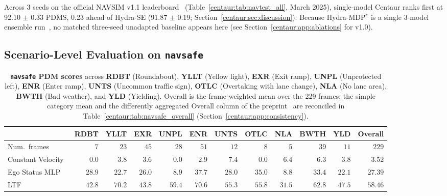 Across 3 seeds on the official NAVSIM v1.1 leaderboard~\cite{dauner2024navsim} (Table~\ref{centaur:tab:navtest_all}, March 2025), single-model Centaur ranks first at 92.10 $\pm$ 0.33 PDMS, 0.23 ahead of Hydra-SE (91.87 $\pm$ 0.19; Section~\ref{centaur:sec:discussion}). Because Hydra-MDP$^{\ast}$ is a single 3-model ensemble run~\cite{li2024hydramdp}, no matched three-seed unadapted baseline appears here (see Section~\ref{centaur:app:ablations} for v1.0).

\subsection{Scenario-Level Evaluation on \texorpdfstring{\texttt{navsafe}}{navsafe}}\label{centaur:sec:navsafe_results}
\suppressfloats[t]

\begin{table}[tbp]
  \centering
  \caption[\texttt{navsafe} PDM scores by scenario category]{\textbf{\texttt{navsafe} PDM scores} across \textbf{RDBT} (Roundabout), \textbf{YLLT} (Yellow light), \textbf{EXR} (Exit ramp), \textbf{UNPL} (Unprotected left), \textbf{ENR} (Enter ramp), \textbf{UNTS} (Uncommon traffic sign), \textbf{OTLC} (Overtaking with lane change), \textbf{NLA} (No lane area), \textbf{BWTH} (Bad weather), and \textbf{YLD} (Yielding). Overall is the frame-weighted mean over the 229 frames; the simple category mean and the differently aggregated Overall column of the preprint~\cite{sima2024centaur} are reconciled in Table~\ref{centaur:tab:navsafe_overall} (Section~\ref{centaur:app:consistency}).}
  \label{centaur:tab:navsafe}
  \begin{adjustbox}{max width=\textwidth}
  \begin{tabular}{l|rrrrrrrrrr|r}
    \toprule
    & \textbf{RDBT} & \textbf{YLLT} & \textbf{EXR} & \textbf{UNPL} & \textbf{ENR} & \textbf{UNTS} & \textbf{OTLC} & \textbf{NLA} & \textbf{BWTH} & \textbf{YLD} & \textbf{Overall} \\
    \midrule
    Num.\ frames & $7$ & $23$ & $45$ & $28$ & $51$ & $12$ & $8$ & $5$ & $39$ & $11$ & $229$ \\
    \midrule
    Constant Velocity~\cite{dauner2024navsim} & $0.0$ & $3.8$ & $3.6$ & $0.0$ & $2.9$ & $7.4$ & $0.0$ & $6.4$ & $6.3$ & $3.8$ & $3.52$ \\
    Ego Status MLP~\cite{dauner2024navsim} & $28.9$ & $22.7$ & $26.0$ & $8.9$ & $37.7$ & $28.0$ & $35.0$ & $8.8$ & $33.4$ & $22.1$ & $27.39$ \\
    LTF~\cite{chitta2023transfuser} & $42.8$ & $\mathbf{70.2}$ & $43.8$ & $59.4$ & $70.6$ & $55.3$ & $55.8$ & $31.5$ & $62.8$ & $47.5$ & $58.46$ \\

\end{tabular}
\end{adjustbox}
\end{table}
